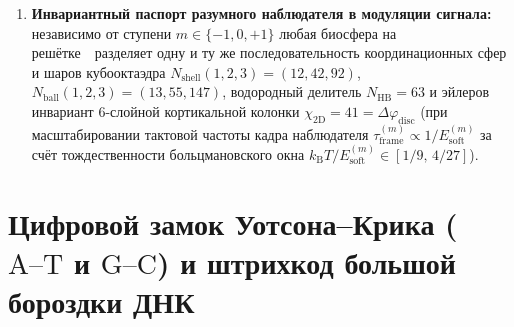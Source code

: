 \begin{corollary}
\begin{enumerate}[leftmargin=*,noitemsep]
  \[
    f_{13} = \frac{f_{\mathrm{HI}}}{N_\varphi} \approx 109{,}26\ \mathrm{МГц},\qquad
    f_{63} = \frac{f_{\mathrm{HI}}}{N_{\mathrm{HB}}} \approx 22{,}546\ \mathrm{МГц}.
  \]
  Поскольку частоты метрового и особенно декаметрового диапазона ($<30\ \mathrm{МГц}$) подвержены отсечке и фазовым искажениям в земной ионосфере, а также маскируются галактическим синхротронным фоном и техногенными помехами Земли, канал $f_{63}\approx 22{,}55\ \mathrm{МГц}$ (вместе с $f_{13}\approx 109{,}3\ \mathrm{МГц}$) представляет собой целевой диапазон именно для космических и лунных радиоинтерферометров на обратной стороне Луны (таких как \texttt{LuSEE-Night} и \texttt{FARSIDE}), а не для наземных радиотелескопов.
\item \textbf{Инвариантный паспорт разумного наблюдателя в модуляции сигнала:}
  независимо от ступени $m\in\{-1,0,+1\}$ любая биосфера на решётке~\latGCKshort\ разделяет одну и ту же последовательность координационных сфер и шаров кубооктаэдра $N_{\mathrm{shell}}(1,2,3) = (12,42,92)$, $N_{\mathrm{ball}}(1,2,3) = (13,55,147)$, водородный делитель $N_{\mathrm{HB}}=63$ и эйлеров инвариант $6$-слойной кортикальной колонки $\chi_{\mathrm{2D}} = 41 = \Delta\varphi_{\mathrm{disc}}$ (при масштабировании тактовой частоты кадра наблюдателя $\tau_{\mathrm{frame}}^{(m)} \propto 1/E_{\mathrm{soft}}^{(m)}$ за счёт тождественности больцмановского окна $k_{\mathrm{B}}T/E_{\mathrm{soft}}^{(m)} \in [1/9,\,4/27]$).
\end{enumerate}
\end{corollary}

\section{Цифровой замок Уотсона--Крика (\texorpdfstring{$\text{A--T}$}{A-T} и \texorpdfstring{$\text{G--C}$}{G-C}) и штрихкод большой бороздки ДНК}
\label{sec:chem-watson-crick-barcode}

